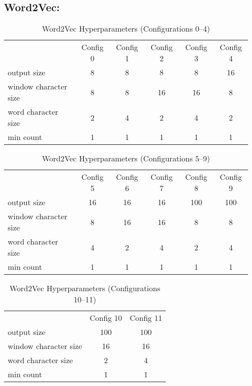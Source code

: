     \subsection{Word2Vec:}
        \begin{table}[ht]
            \centering
            \caption{Word2Vec Hyperparameters (Configurations 0–4)}
            \begin{tabular}{lccccc}
                & Config 0 & Config 1 & Config 2 & Config 3 & Config 4 \\
                output size & 8 & 8 & 8 & 8 & 16 \\
                window character size & 8 & 8 & 16 & 16 & 8 \\
                word character size & 2 & 4 & 2 & 4 & 2 \\
                min count & 1 & 1 & 1 & 1 & 1 \\
            \end{tabular}
        \end{table}

        \begin{table}[ht]
            \centering
            \caption{Word2Vec Hyperparameters (Configurations 5–9)}
            \begin{tabular}{lccccc}
                & Config 5 & Config 6 & Config 7 & Config 8 & Config 9 \\
                output size & 16 & 16 & 16 & 100 & 100 \\
                window character size & 8 & 16 & 16 & 8 & 8 \\
                word character size & 4 & 2 & 4 & 2 & 4 \\
                min count & 1 & 1 & 1 & 1 & 1 \\
            \end{tabular}
        \end{table}

        \begin{table}[ht]
            \centering
            \caption{Word2Vec Hyperparameters (Configurations 10–11)}
            \begin{tabular}{lcc}
                & Config 10 & Config 11 \\
                output size & 100 & 100 \\
                window character size & 16 & 16 \\
                word character size & 2 & 4 \\
                min count & 1 & 1 \\
            \end{tabular}
        \end{table}


